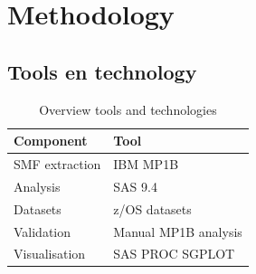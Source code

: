 

\section{Methodology}%
\label{sec:methodologie}


\subsection{Tools en technology}
\begin{table}[h]
    \centering
    \renewcommand{\arraystretch}{1.3}
    \begin{tabular}{|l|l|}
        \hline
        \textbf{Component} & \textbf{Tool} \\
        \hline
        SMF extraction      & IBM MP1B \\
        Analysis  & SAS 9.4 \\
        Datasets       & z/OS datasets \\
        Validation          & Manual MP1B analysis \\
        Visualisation       & SAS PROC SGPLOT \\
        \hline
    \end{tabular}
    \caption{Overview tools and technologies}
\end{table}

